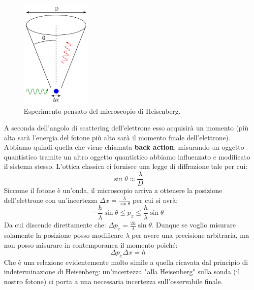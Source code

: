 \begin{figure}
\includegraphics[width=3.5cm]{images/heisenberg_microscope.png}
\caption{Esperimento pensato del microscopio di Heisenberg.}\label{img-heisenberg_microscope}
\end{figure} 
\noindent A seconda dell'angolo di scattering dell'elettrone esso acquisirà un momento (più alta sarà l'energia del fotone più alto sarà il momento finale dell'elettrone).
Abbiamo quindi quella che viene chiamata \textbf{back action}: misurando un oggetto quantistico tramite un altro oggetto quantistico abbiamo influenzato e modificato il sistema stesso.
L'ottica classica ci fornisce una legge di diffrazione tale per cui:
\begin{equation*}
    \sin \theta \approx \frac{\lambda}{D}
\end{equation*}
Siccome il fotone è un'onda, il microscopio arriva a ottenere la posizione dell'elettrone con un'incertezza $\Delta x = \frac{\lambda}{\sin \theta}$ per cui si avrà:
\begin{equation*}
    -\frac{h}{\lambda}\sin \theta \le p_x \le \frac{h}{\lambda}\sin \theta
\end{equation*}
Da cui discende direttamente che: $\Delta p_x = \frac{2 h}{\lambda}\sin \theta$.
Dunque se voglio misurare solamente la posizione posso modificare $\lambda$ per avere una precisione arbitraria, ma non posso misurare in contemporanea il momento poiché:
\begin{equation*}
    \Delta p_x \Delta x = h
\end{equation*}
Che è una relazione evidentemente molto simile a quella ricavata dal principio di indeterminazione di Heisenberg: un'incertezza "alla Heisenberg" sulla sonda (il nostro fotone) ci porta a una necessaria incertezza sull'osservabile finale.